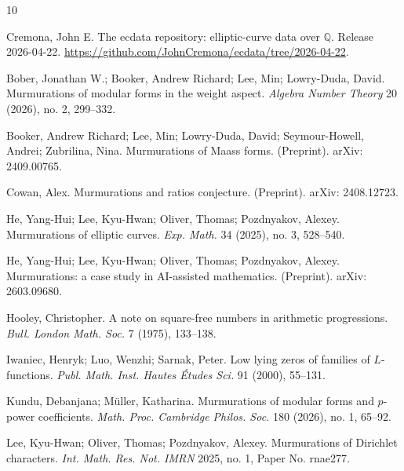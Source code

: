 \documentclass[12pt,reqno]{amsart}
\numberwithin{equation}{section}
\theoremstyle{plain}
\theoremstyle{definition}
\theoremstyle{remark}
\begin{document}
\begin{thebibliography}{10}

Cremona, John E.
The ecdata repository: elliptic-curve data over $\mathbb Q$.
Release 2026-04-22.
\url{https://github.com/JohnCremona/ecdata/tree/2026-04-22}.

Bober, Jonathan W.; Booker, Andrew Richard; Lee, Min; Lowry-Duda, David.
Murmurations of modular forms in the weight aspect.
\emph{Algebra Number Theory} 20 (2026), no. 2, 299--332.


Booker, Andrew Richard; Lee, Min; Lowry-Duda, David; Seymour-Howell, Andrei; Zubrilina, Nina.
Murmurations of Maass forms.
(Preprint).
arXiv: 2409.00765.


Cowan, Alex.
Murmurations and ratios conjecture.
(Preprint).
arXiv: 2408.12723.


He, Yang-Hui; Lee, Kyu-Hwan; Oliver, Thomas; Pozdnyakov, Alexey.
Murmurations of elliptic curves.
\emph{Exp. Math.} 34 (2025), no. 3, 528--540.


He, Yang-Hui; Lee, Kyu-Hwan; Oliver, Thomas; Pozdnyakov, Alexey.
Murmurations: a case study in AI-assisted mathematics.
(Preprint).
arXiv: 2603.09680.


Hooley, Christopher.
A note on square-free numbers in arithmetic progressions.
\emph{Bull. London Math. Soc.} 7 (1975), 133--138.


Iwaniec, Henryk; Luo, Wenzhi; Sarnak, Peter.
Low lying zeros of families of $L$-functions.
\emph{Publ. Math. Inst. Hautes \'Etudes Sci.}
91 (2000), 55--131.


Kundu, Debanjana; M\"uller, Katharina.
Murmurations of modular forms and $p$-power coefficients.
\emph{Math. Proc. Cambridge Philos. Soc.} 180 (2026), no. 1, 65--92.


Lee, Kyu-Hwan; Oliver, Thomas; Pozdnyakov, Alexey.
Murmurations of Dirichlet characters.
\emph{Int. Math. Res. Not. IMRN} 2025, no. 1, Paper No. rnae277.



\end{thebibliography}
\end{document}
